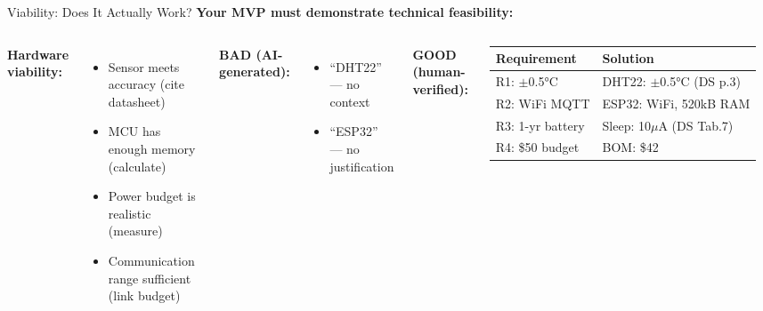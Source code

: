 \documentclass[aspectratio=169,11pt]{beamer}
\begin{document}
\begin{frame}[shrink=10]{Viability: Does It Actually Work?}
    \textbf{Your MVP must demonstrate technical feasibility:}
    
    \vspace{0.15cm}
    \begin{columns}
        \textbf{Hardware viability:}
        \begin{itemize}
            \item Sensor meets accuracy (cite datasheet)
            \item MCU has enough memory (calculate)
            \item Power budget is realistic (measure)
            \item Communication range sufficient (link budget)
        \end{itemize}
        
        \vspace{0.1cm}
        \textbf{BAD (AI-generated):}
        \begin{itemize}
            \item ``DHT22'' --- no context
            \item ``ESP32'' --- no justification
        \end{itemize}
        
        \vspace{0.1cm}
        
        \textbf{GOOD (human-verified):}
        
        \vspace{0.05cm}
        \scriptsize
        \begin{tabular}{p{2.3cm}p{2.6cm}}
            \toprule
            \textbf{Requirement} & \textbf{Solution} \\
            \midrule
            R1: $\pm$0.5°C & DHT22: $\pm$0.5°C (DS p.3) \\
            R2: WiFi MQTT & ESP32: WiFi, 520kB RAM \\
            R3: 1-yr battery & Sleep: 10$\mu$A (DS Tab.7) \\
            R4: \$50 budget & BOM: \$42 \\
            \bottomrule
        \end{tabular}
        \normalsize
        

\end{columns}
\end{frame}
\end{document}
